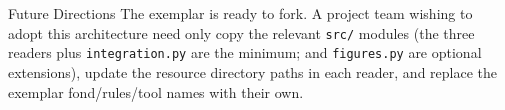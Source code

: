 \documentclass[
  ignorenonframetext,
]{beamer}
\begin{document}
\begin{frame}{Future Directions}
The exemplar is ready to fork. A project team wishing to adopt this
architecture need only copy the relevant \texttt{src/} modules (the
three readers plus \texttt{integration.py} are the minimum;
 and \texttt{figures.py} are optional
extensions), update the resource directory paths in each reader, and
replace the exemplar fond/rules/tool names with their own.
\end{frame}
\end{document}
